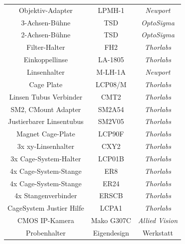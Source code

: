 \documentclass[titlepage]{article}
\begin{document}
\begin{table}[h!]
\begin{tabular}{|c|c|c|}
			Objektiv-Adapter         & LPMH-1                         & \textit{Newport}                       \\
			3-Achsen-Bühne           & TSD                            & \textit{OptoSigma}                     \\
			2-Achsen-Bühne           & TSD                            & \textit{OptoSigma}                     \\
			Filter-Halter            & FH2                            & \textit{Thorlabs}                      \\
			Einkoppellinse           & LA-1805                        & \textit{Thorlabs}                      \\
			Linsenhalter             & M-LH-1A                        & \textit{Newport}                       \\
			Cage Plate               & LCP08/M                        & \textit{Thorlabs}                      \\
			Linsen Tubus Verbinder   & CMT2                           & \textit{Thorlabs}                      \\
			SM2, CMount Adapter      & SM2A54                         & \textit{Thorlabs}                      \\
			Justierbarer Linsentubus & SM2V05                         & \textit{Thorlabs}                      \\
			Magnet Cage-Plate        & LCP90F                         & \textit{Thorlabs}                      \\
			3x xy-Linsenhalter       & CXY2                           & \textit{Thorlabs}                      \\
			3x Cage-System-Halter    & LCP01B                         & \textit{Thorlabs}                      \\
			4x Cage-System-Stange    & ER8                            & \textit{Thorlabs}                      \\
			4x Cage-System-Stange    & ER24                           & \textit{Thorlabs}                      \\
			4x Stangenverbinder      & ERSCB                          & \textit{Thorlabs}                      \\
			CageSystem Justier Hilfe & LCPA1                          & \textit{Thorlabs}                      \\
			CMOS IP-Kamera 			 & Mako G307C					  &	\textit{Allied Vision}				   \\
			Probenhalter		     & Eigendesign                    & Werkstatt                              \\

\end{tabular}
\end{table}
\end{document}
